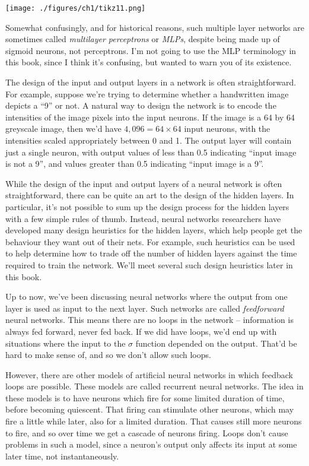 \documentclass[a4paper,twoside,10pt]{book}
\begin{document}
\begin{center}
	\texttt{[image: ./figures/ch1/tikz11.png]}
\end{center}
Somewhat confusingly, and for historical reasons, such multiple layer networks are sometimes called \textit{multilayer perceptrons} or \textit{MLPs}, despite being made up of sigmoid neurons, not perceptrons. I'm not going to use the MLP terminology in this book, since I think it's confusing, but wanted to warn you of its existence.

The design of the input and output layers in a network is often straightforward. For example, suppose we're trying to determine whether a handwritten image depicts a ``9'' or not. A natural way to design the network is to encode the intensities of the image pixels into the input neurons. If the image is a 64 by 64 greyscale image, then we'd have $4,096=64\times64$ input neurons, with the intensities scaled appropriately between 0 and 1. The output layer will contain just a single neuron, with output values of less than 0.5 indicating ``input image is not a 9'', and values greater than 0.5 indicating ``input image is a 9''.

While the design of the input and output layers of a neural network is often straightforward, there can be quite an art to the design of the hidden layers. In particular, it's not possible to sum up the design process for the hidden layers with a few simple rules of thumb. Instead, neural networks researchers have developed many design heuristics for the hidden layers, which help people get the behaviour they want out of their nets. For example, such heuristics can be used to help determine how to trade off the number of hidden layers against the time required to train the network. We'll meet several such design heuristics later in this book.

Up to now, we've been discussing neural networks where the output from one layer is used as input to the next layer. Such networks are called \textit{feedforward} neural networks. This means there are no loops in the network -- information is always fed forward, never fed back. If we did have loops, we'd end up with situations where the input to the $\sigma$ function depended on the output. That'd be hard to make sense of, and so we don't allow such loops.

However, there are other models of artificial neural networks in which feedback loops are possible. These models are called recurrent neural networks. The idea in these models is to have neurons which fire for some limited duration of time, before becoming quiescent. That firing can stimulate other neurons, which may fire a little while later, also for a limited duration. That causes still more neurons to fire, and so over time we get a cascade of neurons firing. Loops don't cause problems in such a model, since a neuron's output only affects its input at some later time, not instantaneously.
\end{document}
